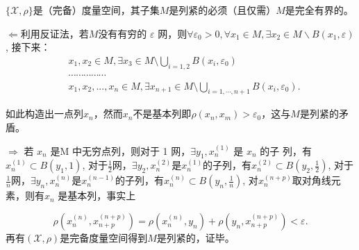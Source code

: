 \begin{theorem}
    $\{\mathscr{X},\rho\}$是（完备）度量空间，其子集$M$是列紧的必须（且仅需）$M$是完全有界的。
\end{theorem}
\begin{solution}
    $\Longleftarrow$利用反证法，若$M$没有有穷的 $\varepsilon$ 网，则$\forall\varepsilon_{0}>0,\forall x_{1}\in M,\exists x_{2}\in M\backslash B\left(x_{1},\varepsilon\right)$, 接下来：
\begin{align*}
    & x_{1},x_{2}\in M,\exists x_{3}\in M\setminus\bigcup\limits_{i=1,2}B\left(x_{i},\varepsilon_{0}\right) \\
    & \cdots\cdots\cdots\cdots\cdots\\
    & x_{1},x_{2},...,x_{n}\in M,\exists x_{n+1}\in M\setminus\bigcup\limits_{i=1,\cdots,n+1}B\left(x_{i},\varepsilon_{0}\right).
\end{align*}

如此构造出一点列$x_n$，然而$x_n$不是基本列即$\rho(x_n,x_m)>\varepsilon_0$，这与$M$是列紧的矛盾。

$\Longrightarrow$ 若 $x_n$ 是M 中无穷点列，则对于 1 网，$\exists y_1,x_n^{(1)}$ 是 $x_n$ 的子 列，有$x_{n}^{\left(1\right)}\subset B\left(y_{1},1\right)$, 对于$\frac{1}{2}$网，$\exists y_{2},x_{n}^{(2)}$是$x_{n}^{(1)}$的子列，有$x_{n}^{(2)}\subset B(y_{2},\frac{1}{2})$,
 对于$\frac{1}{n}$网，$\exists y_{n},x_{n}^{(n)}$是$x_{n}^{(n-1)}$的子列，有$x_{n}^{(n)}\subset B(y_{n},\frac{1}{n})$,
 对$x_n^{(n+p)}$取对角线元素，则有$x_n$ 是基本列，事实上

\begin{equation}
\rho\left(x_{n}^{\left(n\right)},x_{n+p}^{\left(n+p\right)}\right)=\rho\left(x_{n}^{\left(n\right)},y_{n}\right)+\rho\left(y_{n},x_{n+p}^{\left(n+p\right)}\right)<\varepsilon.
\end{equation}
再有$(\mathscr{X},\rho)$是完备度量空间得到$M$是列紧的，证毕。
\end{solution}

